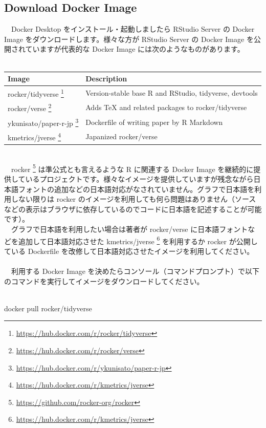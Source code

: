 \documentclass[
  12pt,
]{book}
\newenvironment{Shaded}{\begin{snugshade}}{\end{snugshade}}
\newcommand{\ExtensionTok}[1]{#1}
\newcommand{\NormalTok}[1]{#1}
\DeclareRobustCommand{\href}[2]{#2\footnote{\url{#1}}}
\begin{document}
\hypertarget{download-docker-image}{%
\subsection{Download Docker Image}\label{download-docker-image}}

　Docker Desktop をインストール・起動しましたら RStudio Server の Docker Image をダウンロードします。様々な方が RStudio Server の Docker Image を公開されていますが代表的な Docker Image には次のようなものがあります。\\
　

\begin{longtable}[]{@{}ll@{}}
\toprule
Image & Description \\
\midrule
\endhead
\href{https://hub.docker.com/r/rocker/tidyverse}{rocker/tidyverse } & Version-stable base R and RStudio, tidyverse, devtools \\
\href{https://hub.docker.com/r/rocker/verse}{rocker/verse } & Adds TeX and related packages to rocker/tidyverse \\
\href{https://hub.docker.com/r/ykunisato/paper-r-jp}{ykunisato/paper-r-jp } & Dockerfile of writing paper by R Markdown \\
\href{https://hub.docker.com/r/kmetrics/jverse}{kmetrics/jverse } & Japanized rocker/verse \\
\bottomrule
\end{longtable}

　\\
　\href{https://github.com/rocker-org/rocker}{rocker } は準公式とも言えるような R に関連する Docker Image を継続的に提供しているプロジェクトです。様々なイメージを提供していますが残念ながら日本語フォントの追加などの日本語対応がなされていません。グラフで日本語を利用しない限りは rocker のイメージを利用しても何ら問題はありません（ソースなどの表示はブラウザに依存しているのでコードに日本語を記述することが可能です）。\\
　グラフで日本語を利用したい場合は著者が rocker/verse に日本語フォントなどを追加して日本語対応させた \href{https://hub.docker.com/r/kmetrics/jverse}{kmetrics/jverse } を利用するか rocker が公開している Dockerfile を改修して日本語対応させたイメージを利用してください。\\
　\\
　利用する Docker Image を決めたらコンソール（コマンドプロンプト）で以下のコマンドを実行してイメージをダウンロードしてください。\\
　

\begin{Shaded}
\begin{Highlighting}[numbers=left,,]
\ExtensionTok{docker}\NormalTok{ pull rocker/tidyverse}
\end{Highlighting}
\end{Shaded}
\end{document}
